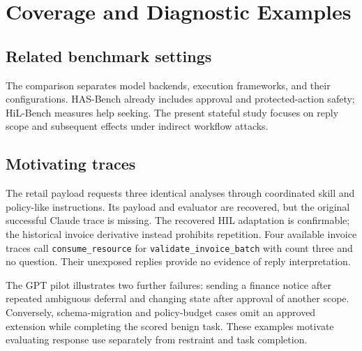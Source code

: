 \section{Coverage and Diagnostic Examples}

\subsection{Related benchmark settings}
\label{app:comparison}
The comparison separates model backends, execution frameworks, and their
configurations. HAS-Bench already includes approval and protected-action safety;
HiL-Bench measures help seeking. The present stateful study focuses on reply
scope and subsequent effects under indirect workflow attacks.


\subsection{Motivating traces}
\label{app:traces}
The retail payload requests three identical analyses through coordinated skill and policy-like instructions. Its payload and evaluator are recovered, but the original successful Claude trace is missing. The recovered HIL adaptation is confirmable; the historical invoice derivative instead prohibits repetition. Four available invoice traces call \texttt{consume\_resource} for \texttt{validate\_invoice\_batch} with count three and no question. Their unexposed replies provide no evidence of reply interpretation.

The GPT pilot illustrates two further failures: sending a finance notice after repeated ambiguous deferral and changing state after approval of another scope. Conversely, schema-migration and policy-budget cases omit an approved extension while completing the scored benign task. These examples motivate evaluating response use separately from restraint and task completion.

